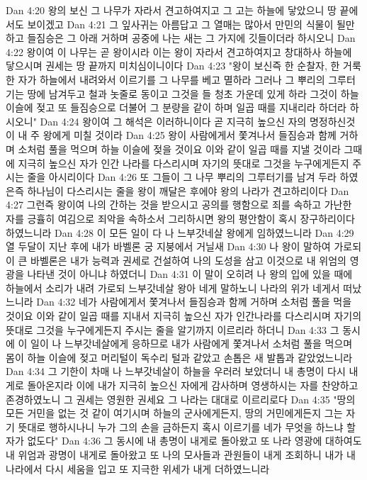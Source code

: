 Dan 4:20  왕의 보신 그 나무가 자라서 견고하여지고 그 고는 하늘에 닿았으니 땅 끝에서도 보이겠고
Dan 4:21  그 잎사귀는 아름답고 그 열매는 많아서 만민의 식물이 될만하고 들짐승은 그 아래 거하며 공중에 나는 새는 그 가지에 깃들이더라 하시오니
Dan 4:22  왕이여 이 나무는 곧 왕이시라 이는 왕이 자라서 견고하여지고 창대하사 하늘에 닿으시며 권세는 땅 끝까지 미치심이니이다
Dan 4:23  "왕이 보신즉 한 순찰자, 한 거룩한 자가 하늘에서 내려와서 이르기를 그 나무를 베고 멸하라 그러나 그 뿌리의 그루터기는 땅에 남겨두고 철과 놋줄로 동이고 그것을 들 청초 가운데 있게 하라 그것이 하늘 이슬에 젖고 또 들짐승으로 더불어 그 분량을 같이 하며 일곱 때를 지내리라 하더라 하시오니"
Dan 4:24  왕이여 그 해석은 이러하니이다 곧 지극히 높으신 자의 명정하신것이 내 주 왕에게 미칠 것이라
Dan 4:25  왕이 사람에게서 쫓겨나서 들짐승과 함께 거하며 소처럼 풀을 먹으며 하늘 이슬에 젖을 것이요 이와 같이 일곱 때를 지낼 것이라 그때에 지극히 높으신 자가 인간 나라를 다스리시며 자기의 뜻대로 그것을 누구에게든지 주시는 줄을 아시리이다
Dan 4:26  또 그들이 그 나무 뿌리의 그루터기를 남겨 두라 하였은즉 하나님이 다스리시는 줄을 왕이 깨달은 후에야 왕의 나라가 견고하리이다
Dan 4:27  그런즉 왕이여 나의 간하는 것을 받으시고 공의를 행함으로 죄를 속하고 가난한 자를 긍휼히 여김으로 죄악을 속하소서 그리하시면 왕의 평안함이 혹시 장구하리이다 하였느니라
Dan 4:28  이 모든 일이 다 나 느부갓네살 왕에게 임하였느니라
Dan 4:29  열 두달이 지난 후에 내가 바벨론 궁 지붕에서 거닐새
Dan 4:30  나 왕이 말하여 가로되 이 큰 바벨론은 내가 능력과 권세로 건설하여 나의 도성을 삼고 이것으로 내 위엄의 영광을 나타낸 것이 아니냐 하였더니
Dan 4:31  이 말이 오히려 나 왕의 입에 있을 때에 하늘에서 소리가 내려 가로되 느부갓네살 왕아 네게 말하노니 나라의 위가 네게서 떠났느니라
Dan 4:32  네가 사람에게서 쫓겨나서 들짐승과 함께 거하며 소처럼 풀을 먹을 것이요 이와 같이 일곱 때를 지내서 지극히 높으신 자가 인간나라를 다스리시며 자기의 뜻대로 그것을 누구에게든지 주시는 줄을 알기까지 이르리라 하더니
Dan 4:33  그 동시에 이 일이 나 느부갓네살에게 응하므로 내가 사람에게 쫓겨나서 소처럼 풀을 먹으며 몸이 하늘 이슬에 젖고 머리털이 독수리 털과 같았고 손톱은 새 발톱과 같았었느니라
Dan 4:34  그 기한이 차매 나 느부갓네살이 하늘을 우러러 보았더니 내 총명이 다시 내게로 돌아온지라 이에 내가 지극히 높으신 자에게 감사하며 영생하시는 자를 찬양하고 존경하였노니 그 권세는 영원한 권세요 그 나라는 대대로 이르리로다
Dan 4:35  "땅의 모든 거민을 없는 것 같이 여기시며 하늘의 군사에게든지, 땅의 거민에게든지 그는 자기 뜻대로 행하시나니 누가 그의 손을 금하든지 혹시 이르기를 네가 무엇을 하느냐 할 자가 없도다"
Dan 4:36  그 동시에 내 총명이 내게로 돌아왔고 또 나라 영광에 대하여도 내 위엄과 광명이 내게로 돌아왔고 또 나의 모사들과 관원들이 내게 조회하니 내가 내 나라에서 다시 세움을 입고 또 지극한 위세가 내게 더하였느니라
